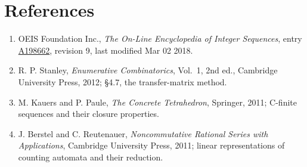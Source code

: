\documentclass[11pt]{article}
\theoremstyle{definition}
\begin{document}
\section{References}

\begin{enumerate}

\item OEIS Foundation Inc., \emph{The On-Line Encyclopedia of Integer Sequences}, entry \href{https://oeis.org/A198662}{A198662}, revision 9, last modified Mar 02 2018.

\item R. P. Stanley, \emph{Enumerative Combinatorics}, Vol.~1, 2nd ed., Cambridge University Press, 2012; \S4.7, the transfer-matrix method.

\item M. Kauers and P. Paule, \emph{The Concrete Tetrahedron}, Springer, 2011; C-finite sequences and their closure properties.

\item J. Berstel and C. Reutenauer, \emph{Noncommutative Rational Series with Applications}, Cambridge University Press, 2011; linear representations of counting automata and their reduction.

\end{enumerate}
\end{document}

